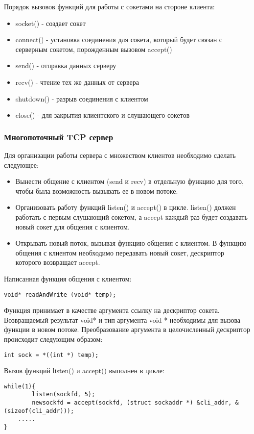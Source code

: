 Порядок вызовов функций для работы с сокетами на стороне клиента:
\begin{itemize}
\item socket() - создает сокет
\item connect() - установка соединения для сокета, который будет связан с серверным сокетом, порожденным вызовом accept()
\item send() - отправка данных серверу
\item recv() - чтение тех же данных от сервера
\item shutdown() - разрыв соединения с клиентом
\item close() - для закрытия клиентского и слушающего сокетов
\end{itemize}

\subsubsection{Многопоточный TCP сервер}
Для организации работы сервера с множеством клиентов необходимо сделать следующее:
\begin{itemize}
\item Вынести общение с клиентом (send и recv) в отдельную функцию для того, чтобы была возможность вызывать ее в новом потоке.
\item Организовать работу функций listen() и accept() в цикле.
listen() должен работать с первым слушающий сокетом, а accept каждый раз будет создавать новый сокет для общения с клиентом.
\item Открывать новый поток, вызывая функцию общения с клиентом.
В функцию общения с клиентом необходимо передавать новый сокет, дескриптор которого возвращает accept.
\end{itemize}
Написанная функция общения с клиентом:
\begin{lstlisting}
void* readAndWrite (void* temp);
\end{lstlisting}
Функция принимает в качестве аргумента ссылку на дескриптор сокета. Возвращаемый результат void* и тип аргумента void * необходимы для вызова функции в новом потоке.
Преобразование аргумента в целочисленный дескриптор происходит следующим образом:
\begin{lstlisting}
int sock = *((int *) temp);
\end{lstlisting}

Вызов функций listen() и accept() выполнен в цикле:
\begin{lstlisting}
while(1){
        listen(sockfd, 5);
        newsockfd = accept(sockfd, (struct sockaddr *) &cli_addr, &(sizeof(cli_addr)));
	.....
}
\end{lstlisting}

